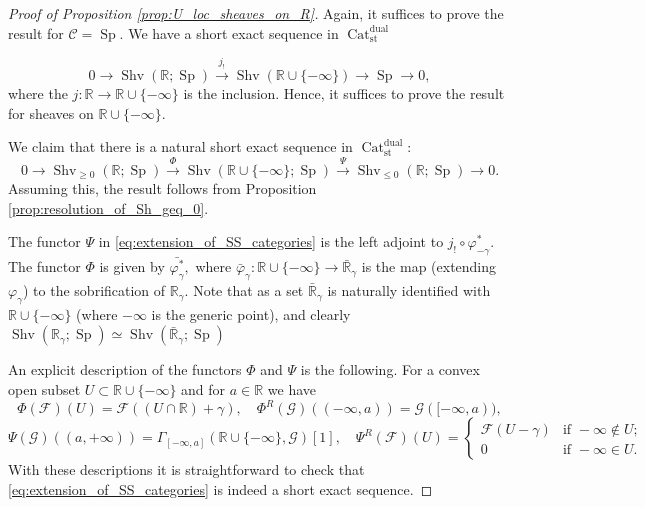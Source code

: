 \documentclass[11pt,leqno]{amsart}
\numberwithin{equation}{section}
\def\R{\mathbb{R}}
\newcommand{\xto}{\xrightarrow}
\newcommand{\Cat}{\operatorname{Cat}}
\newcommand{\St}{\operatorname{St}}
\newcommand{\st}{\operatorname{st}}
\newcommand{\dual}{\operatorname{dual}}
\newcommand{\cF}{{\mathcal F}}
\newcommand{\cG}{{\mathcal G}}
\newcommand{\cC}{{\mathcal C}}
\newcommand{\Sh}{\operatorname{Shv}}
\newcommand{\Sp}{\operatorname{Sp}}
\begin{document}

\begin{proof}[Proof of Proposition \ref{prop:U_loc_sheaves_on_R}]
Again, it suffices to prove the result for $\cC=\Sp.$ We have a short exact sequence in $\Cat_{\st}^{\dual}$

$$0\to \Sh(\R;\Sp)\xto{j_!}\Sh(\R\cup\{-\infty\})\to\Sp\to 0,$$
where the $j:\R\to\R\cup\{-\infty\}$ is the inclusion. Hence, it suffices to prove the result for sheaves on $\R\cup\{-\infty\}.$

We claim that there is a natural short exact sequence in $\Cat_{\st}^{\dual}:$
\begin{equation}\label{eq:extension_of_SS_categories}0\to\Sh_{\geq 0}(\R;\Sp)\xto{\Phi}\Sh(\R\cup\{-\infty\};\Sp)\xto{\Psi} \Sh_{\leq 0}(\R;\Sp)\to 0.\end{equation}
Assuming this, the result follows from Proposition \ref{prop:resolution_of_Sh_geq_0}.

The functor $\Psi$ in \eqref{eq:extension_of_SS_categories} is the left adjoint to $j_!\circ\varphi_{-\gamma}^*.$ The functor $\Phi$ is given by $\bar{\varphi_{\gamma}^*},$ where $\bar{\varphi}_{\gamma}:\R\cup\{-\infty\}\to\bar{\R}_{\gamma}$ is the map (extending $\varphi_{\gamma}$) to the sobrification of $\R_{\gamma}.$ Note that as a set $\bar{\R}_{\gamma}$ is naturally identified with $\R\cup\{-\infty\}$ (where $-\infty$ is the generic point), and clearly $\Sh(\R_{\gamma};\Sp)\simeq \Sh(\bar{\R}_{\gamma};\Sp)$

An explicit description of the functors $\Phi$ and $\Psi$ is the following. For a convex open subset $U\subset\R\cup\{-\infty\}$ and for $a\in\R$ we have
$$\Phi(\cF)(U)=\cF((U\cap\R)+\gamma), \quad \Phi^R(\cG)((-\infty,a))=\cG([-\infty,a)),$$
$$\Psi(\cG)((a,+\infty))=\Gamma_{[-\infty,a]}(\R\cup\{-\infty\},\cG)[1],\quad \Psi^R(\cF)(U)=\begin{cases}\cF(U-\gamma) & \text{if }-\infty\not\in U;\\
0 & \text{if }-\infty\in U.\end{cases}$$
With these descriptions it is straightforward to check that \eqref{eq:extension_of_SS_categories} is indeed a short exact sequence.
\end{proof}
\end{document}
